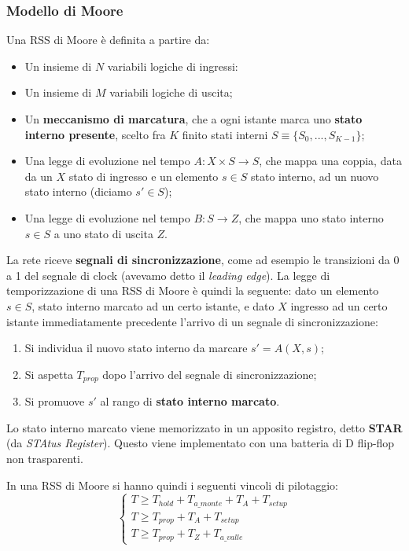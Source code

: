 \documentclass[a4paper,11pt]{article}
\begin{document}
\subsubsection{Modello di Moore}
Una RSS di Moore è definita a partire da:
\begin{itemize}
	\item Un insieme di $N$ variabili logiche di ingressi:
	\item Un insieme di $M$ variabili logiche di uscita;
	\item Un \textbf{meccanismo di marcatura}, che a ogni istante marca uno \textbf{stato interno presente}, scelto fra $K$ finito stati interni $S \equiv \{ S_0, ..., S_{K-1} \}$;
	\item Una legge di evoluzione nel tempo $A: X \times S \rightarrow S$, che mappa una coppia, data da un $X$ stato di ingresso e un elemento $s \in S$ stato interno, ad un nuovo stato interno (diciamo $s' \in S$);
	\item Una legge di evoluzione nel tempo $B:S \rightarrow Z$, che mappa uno stato interno $s \in S$ a uno stato di uscita $Z$.
\end{itemize}

La rete riceve \textbf{segnali di sincronizzazione}, come ad esempio le transizioni da 0 a 1 del segnale di clock (avevamo detto il \textit{leading edge}).
La legge di temporizzazione di una RSS di Moore è quindi la seguente: dato un elemento $s \in S$, stato interno marcato ad un certo istante, e dato $X$ ingresso ad un certo istante immediatamente precedente l'arrivo di un segnale di sincronizzazione:

\begin{enumerate}
	\item Si individua il nuovo stato interno da marcare $s' = A(X, s)$;
	\item Si aspetta $T_{prop}$ dopo l'arrivo del segnale di sincronizzazione;
	\item Si promuove $s'$ al rango di \textbf{stato interno marcato}.
\end{enumerate}

Lo stato interno marcato viene memorizzato in un apposito registro, detto \textbf{STAR} (da \textit{STAtus Register}).
Questo viene implementato con una batteria di D flip-flop non trasparenti.

In una RSS di Moore si hanno quindi i seguenti vincoli di pilotaggio:
\[
	\begin{cases}
		T \geq T_{hold} + T_{a\_monte} + T_A + T_{setup} \\ 
		T \geq T_{prop} + T_A + T_{setup} \\ 
		T \geq T_{prop} + T_Z + T_{a\_valle}
	\end{cases}
\]
\end{document}
